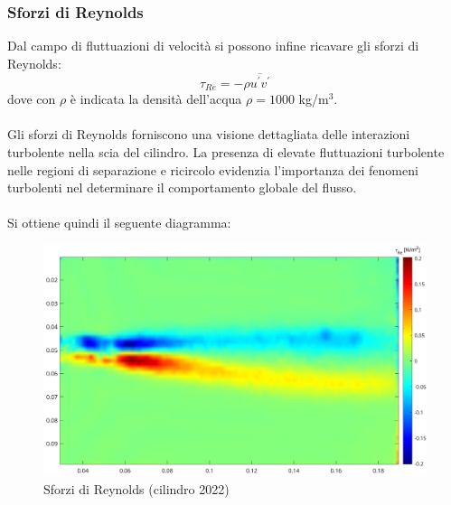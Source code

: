\subsubsection{Sforzi di Reynolds}
Dal campo di fluttuazioni di velocità si possono infine ricavare gli sforzi di Reynolds:
\begin{equation*}
    \tau_{Re} = -\rho \overline{u^\prime v^\prime}
\end{equation*}
dove con $\rho$ è indicata la densità dell'acqua $\rho = 1000$ kg/m$^3$.\\\\
Gli sforzi di Reynolds forniscono una visione dettagliata delle interazioni turbolente nella scia del cilindro. La presenza di elevate fluttuazioni turbolente nelle regioni di separazione e ricircolo evidenzia l'importanza dei fenomeni turbolenti nel determinare il comportamento globale del flusso.\\\\
Si ottiene quindi il seguente diagramma:
\begin{figure}[H]
    \centering
    \includegraphics[width=\textwidth]{images/11/tauRe.png}
    \caption{Sforzi di Reynolds (cilindro 2022)}
\end{figure}